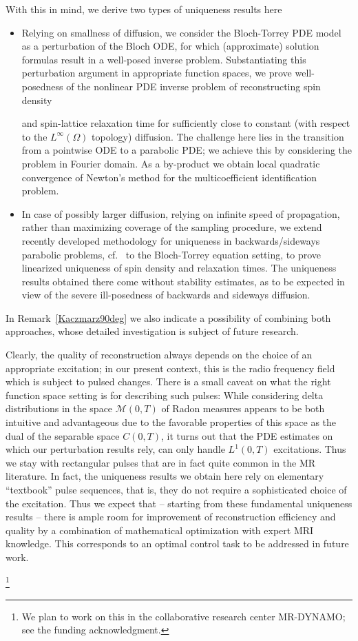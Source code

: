 \documentclass{ws-m3as}
\newcommand{\allximgDzero}[1]{}
\newcommand{\revision}[1]{{ #1}}
\newcommand{\Margin}[1]{}
\begin{document}
With this in mind, we derive two types of uniqueness results here
\begin{itemize}
\item Relying on smallness of diffusion, we consider the Bloch-Torrey PDE model as a perturbation of the Bloch ODE, for which (approximate) solution formulas result in a well-posed inverse problem. Substantiating this perturbation argument in appropriate function spaces, we prove well-posedness of the nonlinear PDE inverse problem of reconstructing spin density 
\allximgDzero{and relaxation times} 
and spin-lattice relaxation time 
for sufficiently close to constant 
(with respect to the $L^\infty(\Omega)$ topology) diffusion.
\revision{The challenge here lies in the transition from a pointwise ODE to a parabolic PDE; we achieve this by considering the problem in Fourier domain.}
As a by-product we obtain local quadratic convergence of Newton's method for the multicoefficient identification problem.
\item In case of possibly larger diffusion, relying on infinite speed of propagation, rather than maximizing coverage of the sampling procedure, we extend \revision{ recently developed } methodology for uniqueness in backwards/sideways parabolic problems, cf.~\cite{JiangLiPauronYamamoto2023}
to the Bloch-Torrey equation setting, to prove linearized uniqueness of spin density and relaxation times. 
The uniqueness results obtained there come without stability estimates, as to be expected in view of the severe ill-posedness of backwards and sideways diffusion.   
\end{itemize}
\Margin{R1 0.}

In Remark~\ref{Kaczmarz90deg} we also indicate a possibility of combining both approaches, whose detailed investigation is subject of future research.

Clearly, the quality of reconstruction always depends on the choice of an appropriate excitation; in our present context, this is the radio frequency field which is subject to pulsed changes.
There is a small caveat on what the right function space setting is for describing such pulses: While considering delta distributions in the space $\mathcal{M}(0,T)$ of Radon measures appears to be both intuitive and advantageous due to the favorable properties of this space as the dual of the separable space $C(0,T)$, it turns out that the PDE estimates on which our perturbation results rely, can only handle $L^1(0,T)$ excitations. 
Thus we stay with rectangular pulses that are in fact quite common in the MR literature.
In fact, the uniqueness results we obtain here rely on elementary ``textbook'' pulse sequences, that is, they do not require a sophisticated choice of the excitation.
Thus we expect that -- starting from these fundamental uniqueness results -- there is ample room for improvement of reconstruction efficiency and quality by a combination of mathematical optimization with expert MRI knowledge.
\revision{This corresponds to an optimal control task to be addressed in future work.}
\Margin{R2 (2)}
\footnote{We plan to work on this in the collaborative research center MR-DYNAMO; 
see the funding acknowledgment.}
\end{document}
